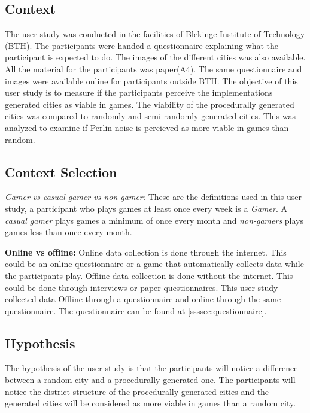 	\subsection{Context}
	The user study was conducted in the facilities of Blekinge Institute of Technology (BTH). The participants were handed a questionnaire explaining what the participant is expected to do. The images of the different cities was also available. All the material for the participants was paper(A4). The same questionnaire and images were available online for participants outside BTH. The objective of this user study is to measure if the participants perceive the implementations generated cities as viable in games. The viability of the procedurally generated cities was compared to randomly and semi-randomly generated cities. This was analyzed to examine if Perlin noise is percieved as more viable in games than random.
	
		
	\subsection{Context Selection}
	\textit{Gamer vs casual gamer vs non-gamer:} These are the definitions used in this user study, a participant who plays games at least once every week is a \textit{Gamer}. A \textit{casual gamer} plays games a minimum of once every month and \textit{non-gamers} plays games less than once every month. 
			
	\textbf{Online vs offline: }
	Online data collection is done through the internet. This could be an online questionnaire or a game that automatically collects data while the participants play. Offline data collection is done without the internet. This could be done through interviews or paper questionnaires. This user study collected data Offline through a questionnaire and online through the same questionnaire. The questionnaire can be found at \ref{ssssec:questionnaire}.
			
	\subsection{Hypothesis}
	The hypothesis of the user study is that the participants will notice a difference between a random city and a procedurally generated one. The participants will notice the district structure of the procedurally generated cities and the generated cities will be considered as more viable in games than a random city.
			
